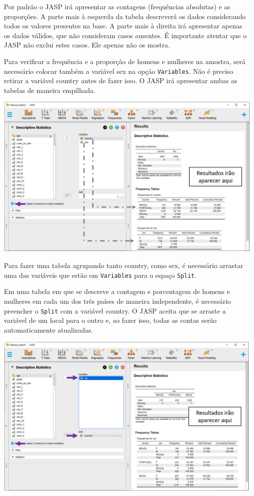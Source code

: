\documentclass[
]{book}
\begin{document}
Por padrão o JASP irá apresentar as contagens (frequências absolutas) e as proporções. A parte mais à esquerda da tabela descreverá os dados considerando todos os valores presentes na base. A parte mais à direita irá apresentar apenas os dados válidos, que não consideram casos ausentes. É importante atentar que o JASP não exclui estes casos. Ele apenas não os mostra.

Para verificar a frequência e a proporção de homens e mulheres na amostra, será necessário colocar também a variável sex na opção \texttt{Variables}. Não é preciso retirar a variável country antes de fazer isso. O JASP irá apresentar ambas as tabelas de maneira empilhada.

\includegraphics{./img/cap_desc_jasp_proporcao_duas_variaveis.png}

Para fazer uma tabela agrupando tanto country, como sex, é necessário arrastar uma das variáveis que estão em \texttt{Variables} para o espaço \texttt{Split}.

Em uma tabela em que se descreve a contagem e porcentagem de homens e mulheres em cada um dos três países de maneira independente, é necessário preencher o \texttt{Split} com a variável country. O JASP aceita que se arraste a variável de um local para o outro e, ao fazer isso, todas as contas serão automaticamente atualizadas.

\includegraphics{./img/cap_desc_jasp_proporcao_duas_variaveis_split.png}
\end{document}

